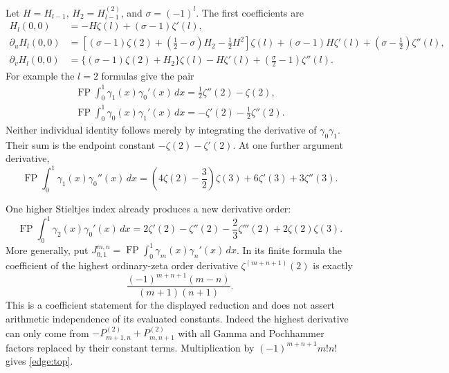 \documentclass[11pt,letterpaper]{article}
\numberwithin{equation}{section}
\theoremstyle{definition}
\theoremstyle{remark}
\begin{document}
Let $H=H_{l-1}$, $H_2=H_{l-1}^{(2)}$, and
$\sigma=(-1)^l$.  The first coefficients are
\begin{align}
 H_l(0,0)&=-H\zeta(l)+(\sigma-1)\zeta'(l),\\
 \partial_u H_l(0,0)
 &=\left[(\sigma-1)\zeta(2)+\left(\frac12-\sigma\right)H_2
                          -\frac12H^2\right]\zeta(l)
       +(\sigma-1)H\zeta'(l)
       +\left(\sigma-\frac12\right)\zeta''(l),
       \label{edge:firstu}\\
 \partial_v H_l(0,0)
 &=\{(\sigma-1)\zeta(2)+H_2\}\zeta(l)
       -H\zeta'(l)+\left(\frac\sigma2-1\right)\zeta''(l).
       \label{edge:firstv}
\end{align}
For example the $l=2$ formulas give the pair
\begin{align}
 \boxed{\operatorname{FP}\int_0^1
       \gamma_1(x)\gamma_0'(x)\,dx
          =\frac12\zeta''(2)-\zeta(2),}
       \label{edge:example10}\\
 \boxed{\operatorname{FP}\int_0^1
       \gamma_0(x)\gamma_1'(x)\,dx
          =-\zeta'(2)-\frac12\zeta''(2).}
       \label{edge:example01}
\end{align}
Neither individual identity follows merely by integrating the
derivative of $\gamma_0\gamma_1$.  Their sum is the endpoint
constant $-\zeta(2)-\zeta'(2)$.
At one further argument derivative,
\begin{equation}
 \operatorname{FP}\int_0^1\gamma_1(x)\gamma_0''(x)\,dx
  =\left(4\zeta(2)-\frac32\right)\zeta(3)
          +6\zeta'(3)+3\zeta''(3).
 \label{edge:example12}
\end{equation}

One higher Stieltjes index already produces a new derivative order:
\begin{equation}
 \operatorname{FP}\int_0^1\gamma_2(x)\gamma_0'(x)\,dx
 =2\zeta'(2)-\zeta''(2)-\frac23\zeta'''(2)
                         +2\zeta(2)\zeta(3).
 \label{edge:example20}
\end{equation}
More generally, put $J_{0,1}^{m,n}=\operatorname{FP}\int_0^1
\gamma_m(x)\gamma_n'(x)\,dx$.  In its finite formula the
coefficient of the highest ordinary-zeta
order derivative $\zeta^{(m+n+1)}(2)$ is exactly
\begin{equation}
 \frac{(-1)^{m+n+1}(m-n)}{(m+1)(n+1)}.
 \label{edge:top}
\end{equation}
This is a coefficient statement for the displayed reduction and does
not assert arithmetic independence of its evaluated constants.
Indeed the highest derivative can only come from
$-P^{(2)}_{m+1,n}+P^{(2)}_{m,n+1}$ with all Gamma and
Pochhammer factors replaced by their constant terms.  Multiplication
by $(-1)^{m+n+1}m!n!$ gives \eqref{edge:top}.
\end{document}
